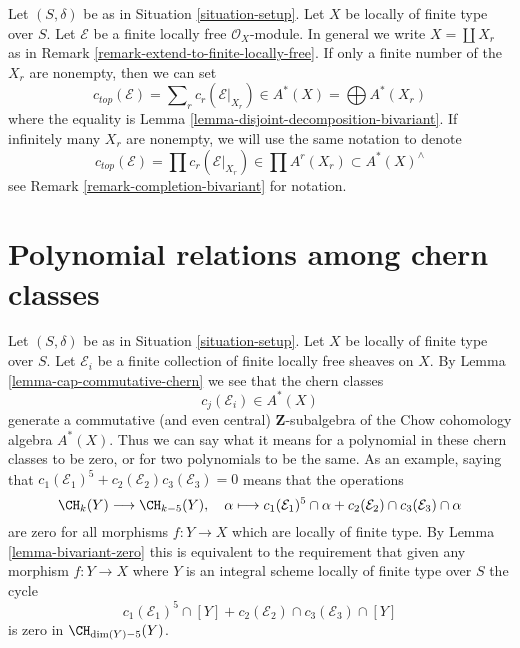 \begin{remark}
\label{remark-top-chern-class}
Let $(S, \delta)$ be as in Situation \ref{situation-setup}. Let $X$
be locally of finite type over $S$. Let $\mathcal{E}$ be a
finite locally free $\mathcal{O}_X$-module. In general
we write $X = \coprod X_r$ as in
Remark \ref{remark-extend-to-finite-locally-free}.
If only a finite number of the $X_r$ are nonempty, then
we can set
$$
c_{top}(\mathcal{E}) = \sum\nolimits_r c_r(\mathcal{E}|_{X_r})
\in A^*(X) = \bigoplus A^*(X_r)
$$
where the equality is Lemma \ref{lemma-disjoint-decomposition-bivariant}.
If infinitely many $X_r$ are nonempty, we will use the same
notation to denote
$$
c_{top}(\mathcal{E}) = \prod c_r(\mathcal{E}|_{X_r})
\in \prod A^r(X_r) \subset A^*(X)^\wedge
$$
see Remark \ref{remark-completion-bivariant} for notation.
\end{remark}











\section{Polynomial relations among chern classes}
\label{section-relations-chern-classes}

\noindent
Let $(S, \delta)$ be as in Situation \ref{situation-setup}. Let $X$ be locally
of finite type over $S$. Let $\mathcal{E}_i$ be a finite collection of finite
locally free sheaves on $X$. By Lemma \ref{lemma-cap-commutative-chern}
we see that the chern classes
$$
c_j(\mathcal{E}_i) \in A^*(X)
$$
generate a commutative (and even central) $\mathbf{Z}$-subalgebra of the
Chow cohomology algebra $A^*(X)$.
Thus we can say what it means for a polynomial in these chern classes
to be zero, or for two polynomials to be the same. As an example, saying that
$c_1(\mathcal{E}_1)^5 + c_2(\mathcal{E}_2)c_3(\mathcal{E}_3) = 0$
means that the operations
$$
\CH_k(Y) \longrightarrow \CH_{k - 5}(Y), \quad
\alpha \longmapsto
c_1(\mathcal{E}_1)^5 \cap \alpha +
c_2(\mathcal{E}_2) \cap c_3(\mathcal{E}_3) \cap \alpha
$$
are zero for all morphisms $f : Y \to X$ which are locally of finite type.
By Lemma \ref{lemma-bivariant-zero}
this is equivalent to the requirement that given any morphism
$f : Y \to X$  where $Y$ is an integral scheme
locally of finite type over $S$ the cycle
$$
c_1(\mathcal{E}_1)^5 \cap [Y] +
c_2(\mathcal{E}_2) \cap c_3(\mathcal{E}_3) \cap [Y]
$$
is zero in $\CH_{\dim(Y) - 5}(Y)$.

